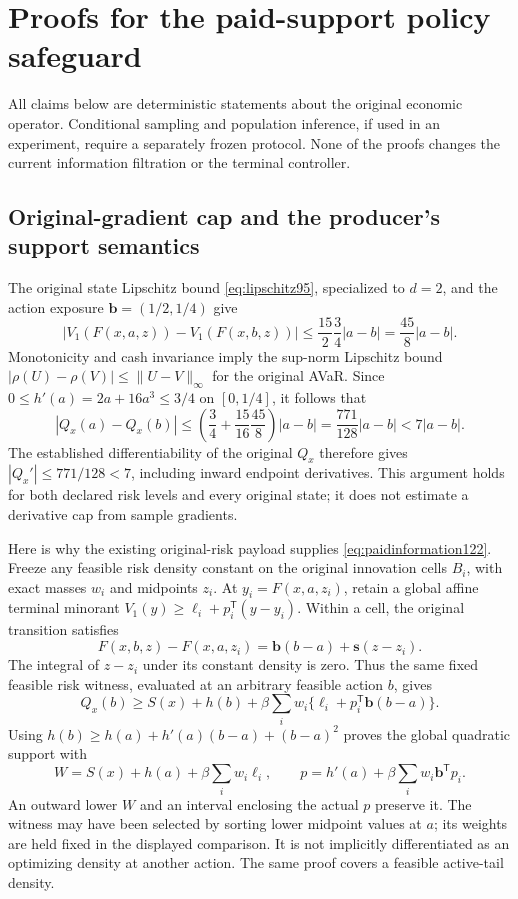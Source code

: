 \section{Proofs for the paid-support policy safeguard}
\label{supp:supportaction122}

All claims below are deterministic statements about the original economic
operator. Conditional sampling and population inference, if used in an
experiment, require a separately frozen protocol. None of the proofs changes
the current information filtration or the terminal controller.

\subsection{Original-gradient cap and the producer's support semantics}

The original state Lipschitz bound \eqref{eq:lipschitz95}, specialized to
$d=2$, and the action exposure $\boldsymbol b=(1/2,1/4)$ give
\[
 |V_1(F(x,a,z))-V_1(F(x,b,z))|
 \le \frac{15}{2}\frac34|a-b|=\frac{45}{8}|a-b|.
\]
Monotonicity and cash invariance imply the sup-norm Lipschitz bound
$|\rho(U)-\rho(V)|\le\|U-V\|_\infty$ for the original AVaR.
Since $0\le h'(a)=2a+16a^3\le3/4$ on $[0,1/4]$, it follows that
\[
 |Q_x(a)-Q_x(b)|\le
 \left(\frac34+\frac{15}{16}\frac{45}{8}\right)|a-b|
 =\frac{771}{128}|a-b|<7|a-b|.
\]
The established differentiability of the original $Q_x$ therefore gives
$|Q_x'|\le771/128<7$, including inward endpoint derivatives.
This argument holds for both declared risk levels and every original state;
it does not estimate a derivative cap from sample gradients.

Here is why the existing original-risk payload supplies
\eqref{eq:paidinformation122}. Freeze any feasible risk density constant
on the original innovation cells $B_i$, with exact masses $w_i$ and
midpoints $z_i$. At $y_i=F(x,a,z_i)$, retain a global affine terminal
minorant $V_1(y)\ge\ell_i+p_i^{\mathsf T}(y-y_i)$.
Within a cell, the original transition satisfies
\[
 F(x,b,z)-F(x,a,z_i)
      =\boldsymbol b(b-a)+\boldsymbol s(z-z_i).
\]
The integral of $z-z_i$ under its constant density is zero.
Thus the same fixed feasible risk witness, evaluated at an arbitrary
feasible action $b$, gives
\[
 Q_x(b)\ge S(x)+h(b)+
  \beta\sum_iw_i\{\ell_i+p_i^{\mathsf T}\boldsymbol b(b-a)\}.
\]
Using $h(b)\ge h(a)+h'(a)(b-a)+(b-a)^2$ proves the global quadratic
support with
\[
 W=S(x)+h(a)+\beta\sum_iw_i\ell_i,\qquad
 p=h'(a)+\beta\sum_iw_i\boldsymbol b^{\mathsf T}p_i.
\]
An outward lower $W$ and an interval enclosing the actual $p$ preserve it.
The witness may have been selected by sorting lower midpoint values at $a$;
its weights are held fixed in the displayed comparison. It is not
implicitly differentiated as an optimizing density at another action.
The same proof covers a feasible active-tail density.

